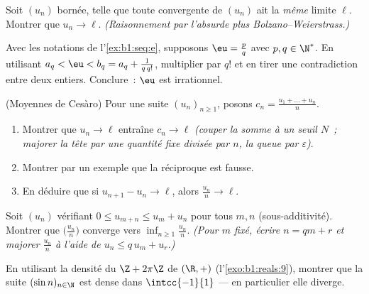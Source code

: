 \begin{exercise}[$\star\star$]\label{exo:b1:seq:8}
Soit $(u_n)$ bornée, telle que toute  convergente de
$(u_n)$ ait la \emph{même} limite $\ell$. Montrer que $u_n \to \ell$.
\emph{(Raisonnement par l'absurde plus Bolzano--Weierstrass.)}
\end{exercise}

\begin{exercise}[$\star\star\star$]\label{exo:b1:seq:9}
Avec les notations de l'\cref{ex:b1:seq:e}, supposons $\eu = \frac pq$
avec $p, q \in \N^*$. En utilisant $a_q < \eu < b_q = a_q + \frac{1}{q\,
q!}$, multiplier par $q!$ et en tirer une contradiction entre deux
entiers. Conclure~: $\eu$ est irrationnel.
\end{exercise}

\begin{exercise}[$\star\star\star$]\label{exo:b1:seq:10}
(Moyennes de Cesàro) Pour une suite $(u_n)_{n \geq 1}$, posons $c_n =
\frac{u_1 + \dots + u_n}{n}$.
\begin{enumerate}
  \item Montrer que $u_n \to \ell$ entraîne $c_n \to \ell$
        \emph{(couper la somme à un seuil $N$~; majorer la tête par
        une quantité fixe divisée par $n$, la queue par
        $\varepsilon$)}.
  \item Montrer par un exemple que la réciproque est fausse.
  \item En déduire que si $u_{n+1} - u_n \to \ell$, alors
        $\frac{u_n}{n} \to \ell$.
\end{enumerate}
\end{exercise}

\begin{exercise}[$\star\star\star$]\label{exo:b1:seq:11}
Soit $(u_n)$ vérifiant $0 \leq u_{m+n} \leq u_m + u_n$ pour tous $m,
n$ (sous-additivité). Montrer que $\bigl(\frac{u_n}{n}\bigr)$ converge
vers $\inf_{n \geq 1} \frac{u_n}{n}$. \emph{(Pour $m$ fixé, écrire $n
= qm + r$ et majorer $\frac{u_n}{n}$ à l'aide de $u_n \leq q\,u_m +
u_r$.)}
\end{exercise}

\begin{exercise}[$\star\star\star$]\label{exo:b1:seq:12}
En utilisant la densité du  $\Z + 2\pi\Z$ de $(\R, +)$
(l'\cref{exo:b1:reals:9}), montrer que la suite $(\sin n)_{n \in
\N}$ est dense dans $\intcc{-1}{1}$ --- en particulier elle diverge.
\end{exercise}

